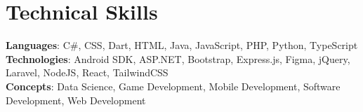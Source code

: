 \section{Technical Skills}
    \begin{itemize}[leftmargin=0.15in, label={}]
	\small{\item{
		\textbf{Languages}{: C\#, CSS, Dart, HTML, Java, JavaScript, PHP, Python, TypeScript} \\
		\textbf{Technologies}{: Android SDK, ASP.NET, Bootstrap, Express.js, Figma, jQuery, Laravel, NodeJS, React, TailwindCSS} \\
		\textbf{Concepts}{: Data Science, Game Development, Mobile Development, Software Development, Web Development}
	}}
    \end{itemize}
